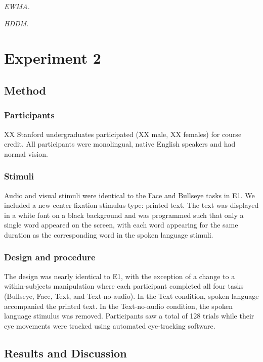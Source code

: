 \documentclass[10pt, letterpaper]{article}
\begin{document}
\emph{EWMA.}

\emph{HDDM.}

\section{Experiment 2}\label{experiment-2}

\subsection{Method}\label{method-1}

\subsubsection{Participants}\label{participants-1}

XX Stanford undergraduates participated (XX male, XX females) for course
credit. All participants were monolingual, native English speakers and
had normal vision.

\subsubsection{Stimuli}\label{stimuli-1}

Audio and visual stimuli were identical to the Face and Bullseye tasks
in E1. We included a new center fixation stimulus type: printed text.
The text was displayed in a white font on a black background and was
programmed such that only a single word appeared on the screen, with
each word appearing for the same duration as the corresponding word in
the spoken language stimuli.

\subsubsection{Design and procedure}\label{design-and-procedure-1}

The design was nearly identical to E1, with the exception of a change to
a within-subjects manipulation where each participant completed all four
tasks (Bullseye, Face, Text, and Text-no-audio). In the Text condition,
spoken language accompanied the printed text. In the Text-no-audio
condition, the spoken language stimulus was removed. Participants saw a
total of 128 trials while their eye movements were tracked using
automated eye-tracking software.

\subsection{Results and Discussion}\label{results-and-discussion-1}
\end{document}
